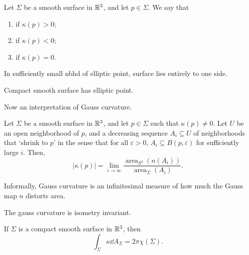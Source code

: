 \documentclass[a4paper]{article}
\begin{document}
\begin{definition}
    Let $\Sigma$ be a smooth surface in $\mathbb{R}^3$, and let $p \in \Sigma$. We say that
    \begin{enumerate}[label=(\roman*)]
        \item {} if $\kappa(p) > 0$;
        \item {} if $\kappa(p) < 0$;
        \item {} if $\kappa(p) = 0$.
    \end{enumerate}
\end{definition}

\begin{lemma}
    In sufficiently small nbhd of elliptic point, surface lies entirely to one side.
\end{lemma}
\begin{theorem}
    Compact smooth surface has elliptic point.
\end{theorem}

Now an interpretation of Gauss curvature. 

\begin{theorem}
    Let $\Sigma$ be a smooth surface in $\mathbb{R}^3$, and let $p \in \Sigma$ such that $\kappa(p) \neq 0$. Let $U$ be an open neighborhood of $p$, and a decreasing sequence $A_i \subseteq U$ of neighborhoods that `shrink to $p$' in the sense that for all $\varepsilon > 0$, $A_i \subseteq B(p, \varepsilon)$ for sufficiently large $i$. Then,
    $$
    |\kappa(p) | = \lim_{i \to \infty} \frac{\operatorname{area}_{S^2}(n(A_i))}{\operatorname{area}_\Sigma (A_i)}.
    $$
\end{theorem}
Informally, Gauss curvature is an infinitesimal measure of how much the Gauss map $n$ distorts area.

\begin{theorem}
    The gauss curvature is isometry invariant.
\end{theorem}

\begin{theorem}
    If $\Sigma$ is a compact smooth surface in $\mathbb{R}^3$, then
    $$
    \int_{\Sigma} \kappa \dd A_\Sigma = 2 \pi \chi(\Sigma).
    $$
\end{theorem}
\end{document}
